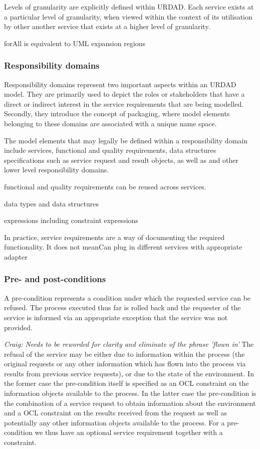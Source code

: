 
Levels of granularity are explicitly defined within URDAD. Each service exists at a particular level of granularity, when viewed within the context of its utilisation by other another service that exists at a higher level of granularity.

forAll is equivalent to UML expansion regions

\subsubsection{Responsibility domains}

Responsibility domains represent two important aspects within an URDAD model. They are primarily used to depict the roles or stakeholders that have  a direct or indirect interest in the service requirements that are being modelled. Secondly, they introduce the concept of packaging, where model elements belonging to these domains are associated with a unique name space. 

The model elements that may legally be defined within a responsibility domain include services, functional and quality requirements, data structures specifications such as service request and result objects, as well as and other lower level responsibility domains.







functional and quality requirements can be reused across services. 

data types and data structures

expressions including constraint expressions

 In practice, service requirements are a way of documenting the required functionality. It does not meanCan plug in different services with appropriate adapter


\subsubsection{Pre- and post-conditions}

A pre-condition represents a condition under which the requested service can be refused. The process executed thus far is rolled back and the requester of the service is informed via an appropriate exception that the service was not provided. 

{\em Craig: Needs to be reworded for clarity and eliminate of the phrase 'flown in'}
The refusal of the service may be either due to information within the process (the original requests or any other information which has flown into the process via results from previous service requests), or due to the state of the environment. In the former case the pre-condition itself is specified as an OCL constraint on the information objects available to the process. In the latter case the pre-condition is the combination of a service request to obtain information about the environment and a OCL constraint on the results received from the request as well as potentially any other information objects available to the process. For a pre-condition we thus have an optional service requirement together with a constraint.

